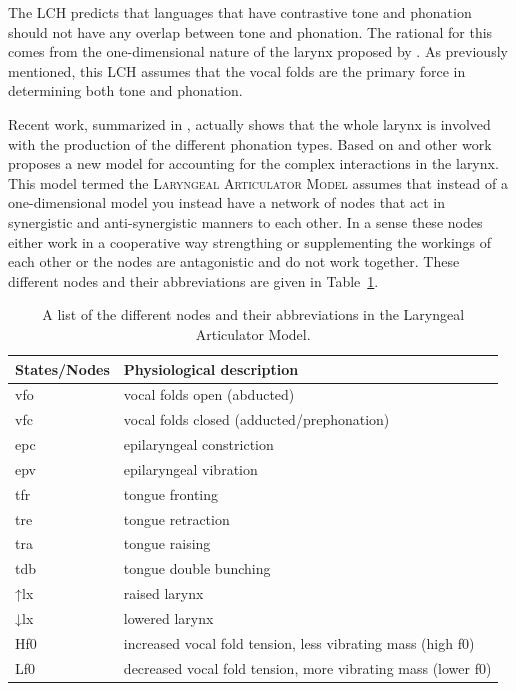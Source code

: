 \documentclass[12pt, letterpaper]{article}
\providecommand{\lsptoprule}{\midrule\toprule}
\providecommand{\lspbottomrule}{\bottomrule\midrule}
\begin{document}
The LCH predicts that languages that have contrastive tone and phonation should not have any overlap between tone and phonation. The rational for this comes from the one-dimensional nature of the larynx proposed by \citet{ladefogedPreliminariesLinguisticPhonetics1971}. As previously mentioned, this LCH assumes that the vocal folds are the primary force in determining both tone and phonation.

Recent work, summarized in \citet{eslingVoiceQualityLaryngeal2019}, actually shows that the whole larynx is involved with the production of the different phonation types. Based on \citet{moisikModelingBiomechanicalInfluence2014} and other work \citet{eslingVoiceQualityLaryngeal2019} proposes a new model for accounting for the complex interactions in the larynx. This model termed the \textsc{Laryngeal Articulator Model} assumes that instead of a one-dimensional model you instead have a network of nodes that act in synergistic and anti-synergistic manners to each other. In a sense these nodes either work in a cooperative way strengthing or supplementing the workings of each other or the nodes are antagonistic and do not work together. These different nodes and their abbreviations are given in Table~\ref{tab:States}.
\begin{table}[!ht]
	\centering
	\caption{A list of the different nodes and their abbreviations in the Laryngeal Articulator Model.}
	\label{tab:States}
	 \begin{tabular}{ll}
	  \lsptoprule
	  States/Nodes	&	 Physiological description \\
	  \hline
	  	vfo   	&  vocal folds open (abducted) \\
		vfc    	&  vocal folds closed (adducted/prephonation)\\
		epc   	&  epilaryngeal constriction\\
		epv			&  epilaryngeal vibration \\
		tfr 		&  tongue fronting \\
		tre 		&  tongue retraction \\
		tra 		&  tongue raising \\
		tdb 		&	 tongue double bunching\\
		↑lx     &  raised larynx\\
		↓lx			&  lowered larynx\\
		Hf0			&  increased vocal fold tension, less vibrating mass (high f0)\\
		Lf0			&  decreased vocal fold tension, more vibrating mass (lower f0)\\
	  \lspbottomrule
	 \end{tabular}
\end{table}
\end{document}
